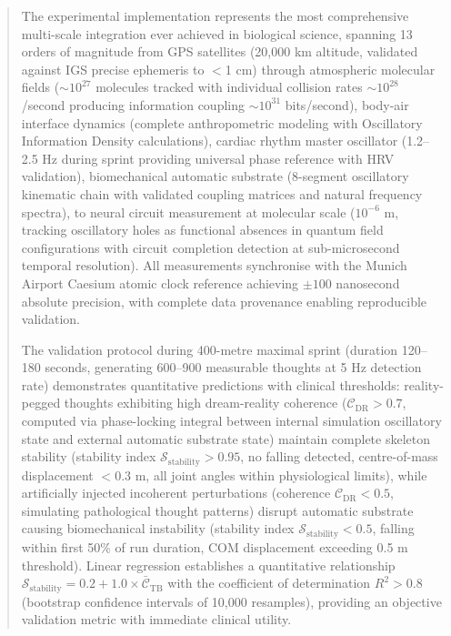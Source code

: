 \documentclass[11pt,onecolumn]{article}
\begin{document}
\begin{abstract}
The experimental implementation represents the most comprehensive multi-scale integration ever achieved in biological science, spanning 13 orders of magnitude from GPS satellites (20,000 km altitude, validated against IGS precise ephemeris to $<$1 cm) through atmospheric  molecular fields ($\sim 10^{27}$ molecules tracked with individual collision rates $\sim 10^{28}$ /second producing information coupling $\sim 10^{31}$ bits/second), body-air interface dynamics (complete anthropometric modeling with Oscillatory Information Density calculations), cardiac rhythm master oscillator (1.2--2.5 Hz during sprint providing universal phase reference with HRV validation), biomechanical automatic substrate (8-segment oscillatory kinematic chain with validated coupling matrices and natural frequency spectra), to neural circuit measurement at molecular scale ($10^{-6}$ m, tracking oscillatory holes as functional absences in  quantum field configurations with circuit completion detection at sub-microsecond temporal resolution). All measurements synchronise with the Munich Airport Caesium atomic clock reference achieving $\pm 100$ nanosecond absolute precision, with complete data provenance enabling reproducible validation.

The validation protocol during 400-metre maximal sprint (duration 120--180 seconds, generating 600--900 measurable thoughts at 5 Hz detection rate) demonstrates quantitative predictions with clinical thresholds: reality-pegged thoughts exhibiting high dream-reality coherence ($\mathcal{C}_{\text{DR}} > 0.7$, computed via phase-locking integral between internal simulation oscillatory state and external automatic substrate state) maintain complete skeleton stability (stability index $\mathcal{S}_{\text{stability}} > 0.95$, no falling detected, centre-of-mass displacement $< 0.3$ m, all joint angles within physiological limits), while artificially injected incoherent perturbations (coherence $\mathcal{C}_{\text{DR}} < 0.5$, simulating pathological thought patterns) disrupt automatic substrate causing biomechanical instability (stability index $\mathcal{S}_{\text{stability}} < 0.5$, falling within first 50\% of run duration, COM displacement exceeding 0.5 m threshold). Linear regression establishes a quantitative relationship $\mathcal{S}_{\text{stability}} = 0.2 + 1.0 \times \bar{\mathcal{C}}_{\text{TB}}$ with the coefficient of determination $R^2 > 0.8$ (bootstrap confidence intervals of 10,000 resamples), providing an objective validation metric with immediate clinical utility.


\end{abstract}
\end{document}
